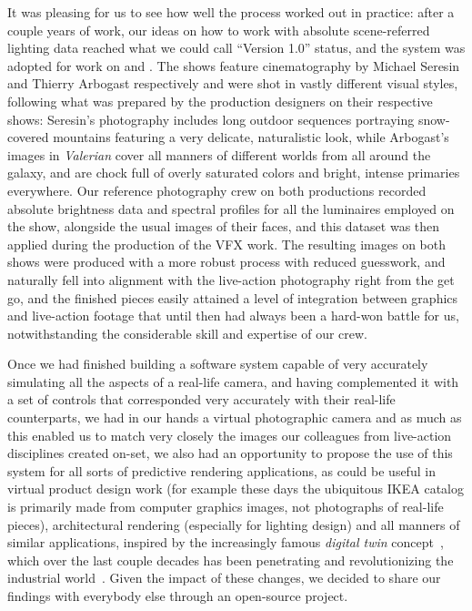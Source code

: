 It was pleasing for us to see how well the process worked out in practice: 
after a couple years of work, our ideas on how to work with absolute scene-referred
lighting data reached what we could call ``Version 1.0'' status, 
and the system was adopted for work on \cite{wfpota2017} and \cite{valerian2017}. 
The shows feature cinematography by Michael Seresin and Thierry Arbogast respectively and were shot 
in vastly different visual styles, following what was prepared by the production designers
on their respective shows: Seresin's photography includes long outdoor sequences portraying 
snow-covered mountains featuring a very delicate, naturalistic look, while Arbogast's images 
in \emph{Valerian} cover all manners of different worlds from all around the galaxy, and
are chock full of overly saturated colors and bright, intense primaries everywhere.
Our reference photography crew on both productions recorded absolute brightness data and spectral profiles
for all the luminaires employed on the show, alongside the usual images of their faces, and this dataset
was then applied during the production of the \gls{VFX} work. 
The resulting images on both shows were produced with a more robust process with reduced guesswork, 
and naturally fell into alignment with the live-action photography right from the get go, 
and the finished pieces easily attained a level of integration between graphics and live-action
footage that until then had always been a hard-won battle for us, notwithstanding the considerable
skill and expertise of our crew.


Once we had finished building a software system capable of very accurately simulating 
all the aspects of a real-life camera, and having complemented it with a set of controls
that corresponded very accurately with their real-life counterparts, we had in our hands 
a virtual photographic camera and as much as this enabled us to match very
closely the images our colleagues from live-action disciplines created on-set,
we also had an opportunity to propose the use of this system for all sorts of predictive rendering applications,
as could be useful in virtual product design work (for example these days the ubiquitous IKEA catalog
is primarily made from computer graphics images, not photographs of real-life pieces),
architectural rendering (especially for lighting design) and all manners of similar applications,
inspired by the increasingly famous \emph{digital twin} concept~\cite{gelernter91},
which over the last couple decades has been penetrating and revolutionizing the
industrial world~\cite{grieves02}.
Given the impact of these changes, we decided to share our findings with everybody else through an
open-source project.



